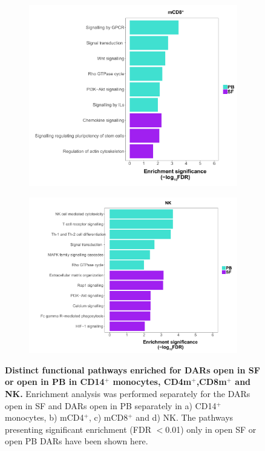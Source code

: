 \begin{figure}[H]
\begin{subfigure}[b]{0.45\textwidth}
\centering
\includegraphics[width=\textwidth]{./Results3/pdfs/ATAC_PSA_CD8_pathways_barplot_all_DOCS_proximity}%
\caption{}
\end{subfigure}
\begin{subfigure}[b]{0.45\textwidth} 
\centering
\includegraphics[width=\textwidth]{./Results3/pdfs/ATAC_PSA_NK_pathways_barplot_all_DOCS_proximity}%
\caption{}
\end{subfigure}
\caption[Distinct functional pathways enriched for DARs open in SF or open in PB in CD14$^+$ monocytes, CD4m$^+$,CD8m$^+$ and NK.]{\textbf{Distinct functional pathways enriched for DARs open in SF or open in PB in CD14$^+$ monocytes, CD4m$^+$,CD8m$^+$ and NK.} Enrichment analysis was performed separately for the DARs open in SF and DARs open in PB separately in a) CD14$^+$ monocytes, b) mCD4$^+$, c) mCD8$^+$ and d) NK. The pathways presenting significant enrichment (FDR $<$0.01) only in open SF or open PB DARs have been shown here.}
\label{figure:PSA_ATAC_pathway_analysis_all_DOC}
\end{figure}


